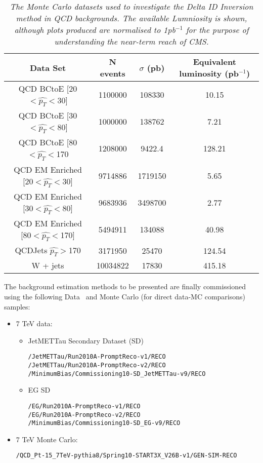 \begin{table}[h!]
\begin{center}
\begin{tabular}{|c|c|c|c|}
\hline
Data Set & N events & $\sigma$ (pb) & Equivalent luminosity (pb$^{-1}$)\\
\hline
QCD BCtoE [20$<\hat{p_{T}}<$30]& 1100000  & 108330 & 10.15\\
QCD BCtoE [30$<\hat{p_{T}}<$80] & 1000000 & 138762 & 7.21\\
QCD BCtoE [80$<\hat{p_{T}}<$170 & 1208000 & 9422.4 & 128.21\\
\hline
QCD EM Enriched [20$<\hat{p_{T}}<$30] & 9714886 & 1719150 & 5.65\\
QCD EM Enriched [30$<\hat{p_{T}}<$80] & 9683936 & 3498700 & 2.77\\
QCD EM Enriched [80$<\hat{p_{T}}<$170] & 5494911 & 134088 & 40.98\\
\hline
QCDJets $\hat{p_{T}}>$170 & 3171950 & 25470 & 124.54\\
\hline
W + jets & 10034822 & 17830 & 415.18\\
\hline
\end{tabular}
\end{center}
\caption{\textit{The Monte Carlo datasets used to investigate the Delta ID Inversion method in QCD backgrounds. The available Lumniosity is shown, although plots produced are normalised to 1pb$^{-1}$ for the purpose of understanding the near-term reach of CMS.}}
\label{tab:datasets}
\end{table}

The background estimation methods to be presented are finally commissioned using the following Data~\cite{PDWG} and Monte Carlo (for direct data-MC comparisons) samples: 
\begin{itemize}
\item 7 TeV data: 
\begin{itemize}
\item JetMETTau Secondary Dataset (SD)
\begin{verbatim}
/JetMETTau/Run2010A-PromptReco-v1/RECO 
/JetMETTau/Run2010A-PromptReco-v2/RECO
/MinimumBias/Commissioning10-SD_JetMETTau-v9/RECO 
\end{verbatim}
\item EG SD
\begin{verbatim}
/EG/Run2010A-PromptReco-v1/RECO 
/EG/Run2010A-PromptReco-v2/RECO 
/MinimumBias/Commissioning10-SD_EG-v9/RECO
\end{verbatim}

\end{itemize}
\item 7 TeV Monte Carlo: \begin{verbatim}/QCD_Pt-15_7TeV-pythia8/Spring10-START3X_V26B-v1/GEN-SIM-RECO \end{verbatim}
\end{itemize}
